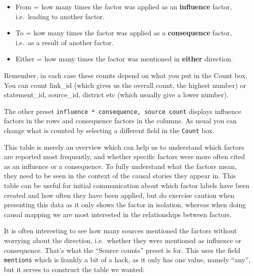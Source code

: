 \documentclass[
]{book}
\providecommand{\tightlist}{%
  \setlength{\itemsep}{0pt}\setlength{\parskip}{0pt}}
\begin{document}
\begin{itemize}
\tightlist
\item
  From = how many times the factor was applied as an \textbf{influence} factor, i.e.~leading to another factor.
\item
  To = how many times the factor was applied as a \textbf{consequence} factor, i.e.~as a result of another factor.
\item
  Either = how many times the factor was mentioned in \textbf{either} direction.
\end{itemize}

Remember, in each case these counts depend on what you put in the Count box. You can count link\_id (which gives us the overall count, the highest number) or statement\_id, source\_id, district etc (which usually give a lower number).

The other preset \texttt{influence\ *\ consequence,\ source\ count} displays influence factors in the rows and consequence factors in the columns. As usual you can change what is counted by selecting a different field in the \texttt{Count} box.

This table is merely an overview which can help us to understand which factors are reported most frequently, and whether specific factors were more often cited as an influence or a consequence. To fully understand what the factors mean, they need to be seen in the context of the causal stories they appear in. This table can be useful for initial communication about which factor labels have been created and how often they have been applied, but do exercise caution when presenting this data as it only shows the factor in isolation, whereas when doing causal mapping we are most interested in the relationships between factors.

It is often interesting to see how many sources mentioned the factors without worrying about the direction, i.e.~whether they were mentioned as influence or consequence. That's what the ``Source counts'' preset is for. This uses the field \texttt{mentions} which is frankly a bit of a hack, as it only has one value, namely ``any'', but it serves to construct the table we wanted:
\end{document}
